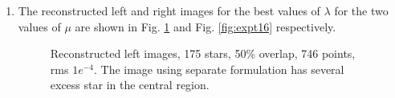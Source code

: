 \begin{enumerate}
\item The reconstructed left and right images for the best values of $\lambda$ for the two values of $\mu$ are shown in Fig. \ref{fig:expt15} and  Fig. \ref{fig:expt16} respectively. 

\vspace{-0.2in}
\begin{figure}[h!]
\hspace{-0.5in}
\hspace{-1in}
\caption [Reconstructed left images, 175 stars, 50\% overlap, 746 points,  rms $1e^{-4}$]{Reconstructed left images, 175 stars, 50\% overlap, 746 points, rms $1e^{-4}$. The image using separate formulation has several excess star in the central region.}
\label{fig:expt15}
\end{figure}


\end{enumerate}
